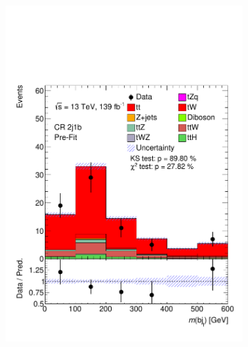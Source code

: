 \begin{figure}[h!] 
  \begin{subfigure}[b]{0.33\linewidth}
    \centering
    \includegraphics[width=\linewidth]{ubonn-thesis/Chapters/Chapters_05/Figure/CR_tt/CR_2j1b_M_bj.pdf} 
  \end{subfigure}%
  \begin{subfigure}[b]{0.33\linewidth}
    \centering

\end{subfigure}
\end{figure}
